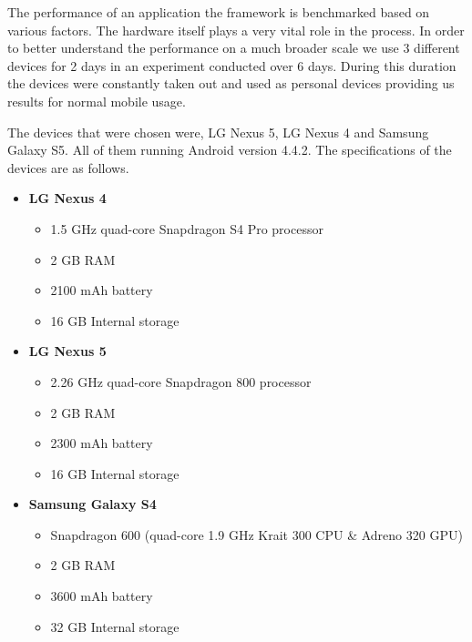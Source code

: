 \documentclass[12pt]{report}
\begin{document}
The performance of an application the framework is benchmarked based on various factors. The hardware itself plays a very vital role in the process. In order to better understand the performance on a much broader scale we use 3 different devices for 2 days in an experiment conducted over 6 days. During this duration the devices were constantly taken out and used as personal devices providing us results for normal mobile usage.

The devices that were chosen were, LG Nexus 5, LG Nexus 4 and Samsung Galaxy S5. All of them running Android version 4.4.2. The specifications of the devices are as follows.

\begin{itemize}
\item \textbf{LG Nexus 4}
    \begin{itemize}
        \item 1.5 GHz quad-core Snapdragon S4 Pro processor
        \item 2 GB RAM
        \item 2100 mAh battery
        \item 16 GB Internal storage
    \end{itemize}

\item \textbf{LG Nexus 5}
    \begin{itemize}
        \item 2.26 GHz quad-core Snapdragon 800 processor
        \item 2 GB RAM
        \item 2300 mAh battery
        \item 16 GB Internal storage
    \end{itemize}

\item \textbf{Samsung Galaxy S4}
    \begin{itemize}
        \item  Snapdragon 600 (quad-core 1.9 GHz Krait 300 CPU \& Adreno 320 GPU)
        \item 2 GB RAM
        \item 3600 mAh battery
        \item 32 GB Internal storage
    \end{itemize}

\end{itemize}
\end{document}
